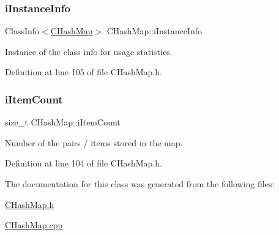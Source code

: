 \subsubsection{\texorpdfstring{i\+Instance\+Info}{iInstanceInfo}}
{\footnotesize\ttfamily Class\+Info$<$\hyperlink{class_c_hash_map}{C\+Hash\+Map}$>$ C\+Hash\+Map\+::i\+Instance\+Info\hspace{0.3cm}{\ttfamily [private]}}



Instance of the class info for usage statistics. 



Definition at line 105 of file C\+Hash\+Map.\+h.

\mbox{\label{class_c_hash_map_aa1740c90e185ad56bf80632fc769c024}} 
\subsubsection{\texorpdfstring{i\+Item\+Count}{iItemCount}}
{\footnotesize\ttfamily size\+\_\+t C\+Hash\+Map\+::i\+Item\+Count\hspace{0.3cm}{\ttfamily [private]}}



Number of the pairs / items stored in the map. 



Definition at line 104 of file C\+Hash\+Map.\+h.



The documentation for this class was generated from the following files\+:\begin{DoxyCompactItemize}
\item 
\hyperlink{_c_hash_map_8h}{C\+Hash\+Map.\+h}\item 
\hyperlink{_c_hash_map_8cpp}{C\+Hash\+Map.\+cpp}\end{DoxyCompactItemize}
